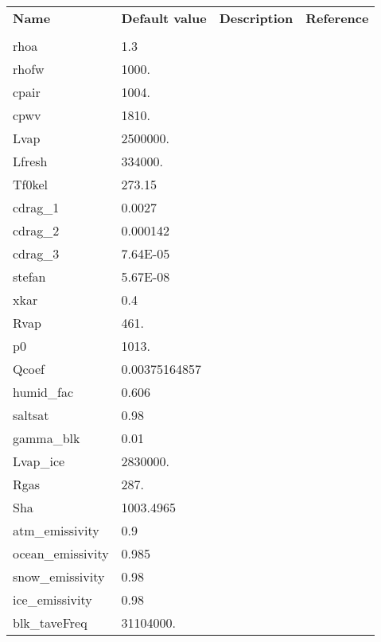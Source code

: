 \newpage

\begin{table}
\hspace*{-1.5in}
\begin{tabular}{lllc}

  \textbf{Name}  &  \textbf{Default value}  
    &  \textbf{Description}   &  \textbf{Reference}  \\
  & & & \\

  rhoa   &   1.3
    &  %
    &  %
    \\
  rhofw   &   1000.
    &  %
    &  %
    \\
  cpair   &   1004.
    &  %
    &  %
    \\
  cpwv   &   1810.
    &  %
    &  %
    \\
  Lvap   &   2500000.
    &  %
    &  %
    \\
  Lfresh   &   334000.
    &  %
    &  %
    \\
  Tf0kel   &   273.15
    &  %
    &  %
    \\
  cdrag\_1   &   0.0027
    &  %
    &  %
    \\
  cdrag\_2   &   0.000142
    &  %
    &  %
    \\
  cdrag\_3   &   7.64E-05
    &  %
    &  %
    \\
  stefan   &   5.67E-08
    &  %
    &  %
    \\
  xkar   &   0.4
    &  %
    &  %
    \\
  Rvap   &   461.
    &  %
    &  %
    \\
  p0   &   1013.
    &  %
    &  %
    \\
  Qcoef   &   0.00375164857
    &  %
    &  %
    \\
  humid\_fac  &   0.606
    &  %
    &  %
    \\
  saltsat   &   0.98
    &  %
    &  %
    \\
  gamma\_blk  &   0.01
    &  %
    &  %
    \\
  Lvap\_ice   &   2830000.
    &  %
    &  %
    \\
  Rgas   &   287.
    &  %
    &  %
    \\
  Sha   &   1003.4965
    &  %
    &  %
    \\
  atm\_emissivity   &   0.9
    &  %
    &  %
    \\
  ocean\_emissivity  &   0.985
    &  %
    &  %
    \\
  snow\_emissivity   &   0.98
    &  %
    &  %
    \\
  ice\_emissivity   &   0.98
    &  %
    &  %
    \\
  blk\_taveFreq  &   31104000.
    &  %
    &  %
    \\

\end{tabular}
\end{table}

